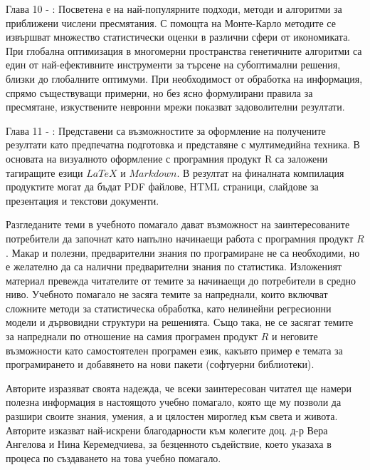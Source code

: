 Глава 10 - : Посветена е на най-популярните подходи, методи и алгоритми за приближени числени пресмятания. С помощта на Монте-Карло методите се извършват множество статистически оценки в различни сфери от икономиката. При глобална оптимизация в многомерни пространства генетичните алгоритми са един от най-ефективните инструменти за търсене на субоптимални решения, близки до глобалните оптимуми. При необходимост от обработка на информация, спрямо съществуващи примерни, но без ясно формулирани правила за пресмятане, изкуствените невронни  мрежи показват задоволителни резултати. 

Глава 11 - : Представени са възможностите за оформление на получените резултати като предпечатна подготовка и представяне с мултимедийна техника. В основата на визуалното оформление с програмния продукт R са заложени тагиращите езици $LaTeX$ и $Markdown$. В резултат на финалната компилация продуктите могат да бъдат PDF файлове, HTML страници, слайдове за презентация и текстови документи. 

Разгледаните теми в учебното помагало дават възможност на заинтересованите потребители да започнат като напълно начинаещи работа с програмния продукт $R$. Макар и полезни, предварителни знания по програмиране не са необходими, но е желателно да са налични предварителни знания по статистика. Изложеният материал превежда читателите от темите за начинаещи до потребители в средно ниво. Учебното помагало не засяга темите за напреднали, които включват сложните методи за статистическа обработка, като нелинейни регресионни модели и дървовидни структури на решенията. Също така, не се засягат темите за напреднали по отношение на самия програмен продукт $R$ и неговите възможности като самостоятелен програмен език, какъвто пример е темата за програмирането и добавянето на нови пакети (софтуерни библиотеки). 

Авторите изразяват своята надежда, че всеки заинтересован читател ще намери полезна информация в настоящото учебно помагало, която ще му позволи да разшири своите знания, умения, а и цялостен мироглед към света и живота. Авторите изказват най-искрени благодарности към колегите доц. д-р Вера Ангелова и Нина Керемедчиева, за безценното съдействие, което указаха в процеса по създаването на това учебно помагало.

